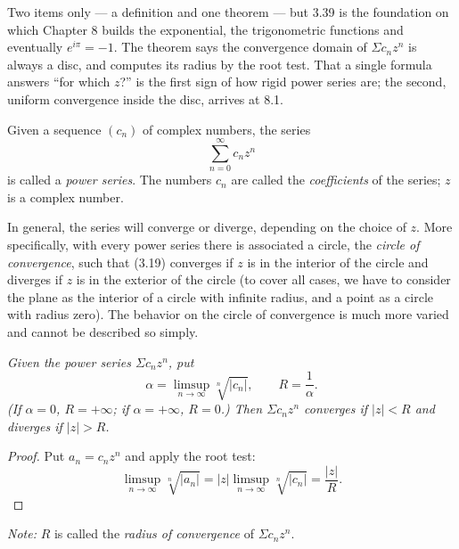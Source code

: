 
\begin{signpost}
Two items only --- a definition and one theorem --- but 3.39 is the
foundation on which Chapter 8 builds the exponential, the trigonometric
functions and eventually $e^{i\pi} = -1$. The theorem says the convergence
domain of $\Sigma c_nz^n$ is always a disc, and computes its radius by the
root test. That a single formula answers ``for which $z$?'' is the first sign
of how rigid power series are; the second, uniform convergence inside the
disc, arrives at 8.1.
\end{signpost}

Given a sequence $(c_n)$ of complex numbers, the series
\begin{equation}
  \sum_{n=0}^{\infty} c_nz^n \tag{3.19}
\end{equation}
is called a \emph{power series}. The numbers $c_n$ are called the
\emph{coefficients} of the series; $z$ is a complex number.

In general, the series will converge or diverge, depending on the choice of
$z$. More specifically, with every power series there is associated a circle,
the \emph{circle of convergence}, such that (3.19) converges if $z$ is in the
interior of the circle and diverges if $z$ is in the exterior of the circle (to
cover all cases, we have to consider the plane as the interior of a circle with
infinite radius, and a point as a circle with radius zero). The behavior on the
circle of convergence is much more varied and cannot be described so simply.

\emph{Given the power series $\Sigma c_nz^n$, put}
\[ \alpha = \limsup_{n\to\infty} \sqrt[n]{|c_n|}, \qquad R = \frac{1}{\alpha}. \]
\emph{(If $\alpha = 0$, $R = +\infty$; if $\alpha = +\infty$, $R = 0$.) Then
$\Sigma c_nz^n$ converges if $|z| < R$ and diverges if $|z| > R$.}

\begin{proof}
Put $a_n = c_nz^n$ and apply the root test:
\[ \limsup_{n\to\infty} \sqrt[n]{|a_n|}
   = |z|\limsup_{n\to\infty} \sqrt[n]{|c_n|} = \frac{|z|}{R}. \]
\end{proof}

\emph{Note:} $R$ is called the \emph{radius of convergence} of
$\Sigma c_nz^n$.

